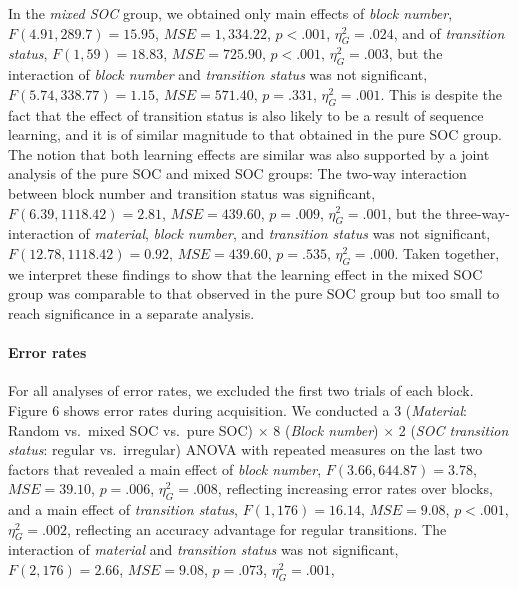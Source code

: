 \documentclass[floatsintext,man]{apa6}
\begin{document}
In the \emph{mixed SOC} group, we obtained only main effects of
\emph{block number}, \(F(4.91, 289.7) = 15.95\),
\(\mathit{MSE} = 1,334.22\), \(p < .001\), \(\eta^2_G = .024\), and of
\emph{transition status}, \(F(1, 59) = 18.83\),
\(\mathit{MSE} = 725.90\), \(p < .001\), \(\eta^2_G = .003\), but the
interaction of \emph{block number} and \emph{transition status} was not
significant, \(F(5.74, 338.77) = 1.15\), \(\mathit{MSE} = 571.40\),
\(p = .331\), \(\eta^2_G = .001\). This is despite the fact that the
effect of transition status is also likely to be a result of sequence
learning, and it is of similar magnitude to that obtained in the pure
SOC group. The notion that both learning effects are similar was also
supported by a joint analysis of the pure SOC and mixed SOC groups: The
two-way interaction between block number and transition status was
significant, \(F(6.39, 1118.42) = 2.81\), \(\mathit{MSE} = 439.60\),
\(p = .009\), \(\eta^2_G = .001\), but the three-way-interaction of
\emph{material}, \emph{block number}, and \emph{transition status} was
not significant, \(F(12.78, 1118.42) = 0.92\),
\(\mathit{MSE} = 439.60\), \(p = .535\), \(\eta^2_G = .000\). Taken
together, we interpret these findings to show that the learning effect
in the mixed SOC group was comparable to that observed in the pure SOC
group but too small to reach significance in a separate analysis.

\paragraph{Error rates}\label{error-rates-1}



For all analyses of error rates, we excluded the first two trials of
each block. Figure 6 shows error rates during acquisition. We conducted
a 3 (\emph{Material}: Random vs.~mixed SOC vs.~pure SOC) \(\times\) 8
(\emph{Block number}) \(\times\) 2 (\emph{SOC transition status}:
regular vs.~irregular) ANOVA with repeated measures on the last two
factors that revealed a main effect of \emph{block number},
\(F(3.66, 644.87) = 3.78\), \(\mathit{MSE} = 39.10\), \(p = .006\),
\(\eta^2_G = .008\), reflecting increasing error rates over blocks, and
a main effect of \emph{transition status}, \(F(1, 176) = 16.14\),
\(\mathit{MSE} = 9.08\), \(p < .001\), \(\eta^2_G = .002\), reflecting
an accuracy advantage for regular transitions. The interaction of
\emph{material} and \emph{transition status} was not significant,
\(F(2, 176) = 2.66\), \(\mathit{MSE} = 9.08\), \(p = .073\),
\(\eta^2_G = .001\),
\end{document}
